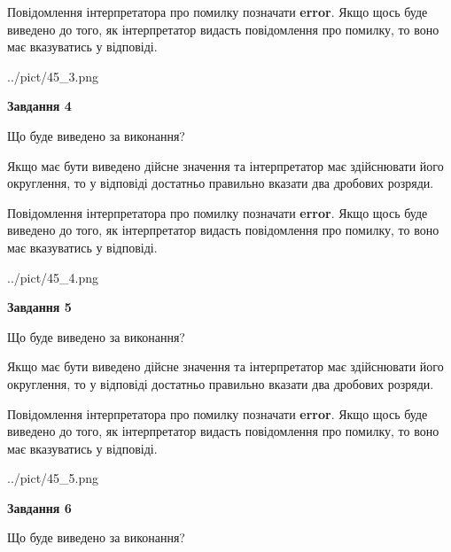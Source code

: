 \documentclass[12pt, ukrainian]{article}
\begin{document}
{\begin {Large}
Повідомлення інтерпретатора про помилку позначати \textbf{error}.
Якщо щось буде виведено до того, як інтерпретатор видасть повідомлення про помилку, 
то воно має вказуватись у відповіді. \par

\begin{center}
	{../pict/45_3.png}
\end{center}
\newpage

{\begin {center}\textbf{Завдання 4}\end {center}}\par
Що буде виведено за виконання? \par

Якщо має бути виведено дійсне значення та інтерпретатор має здійснювати його округлення, 
то у відповіді достатньо правильно вказати два дробових розряди.

Повідомлення інтерпретатора про помилку позначати \textbf{error}.
Якщо щось буде виведено до того, як інтерпретатор видасть повідомлення про помилку, 
то воно має вказуватись у відповіді. \par

\begin{center}
	{../pict/45_4.png}
\end{center}
\newpage

{\begin {center}\textbf{Завдання 5}\end {center}}\par
Що буде виведено за виконання? \par

Якщо має бути виведено дійсне значення та інтерпретатор має здійснювати його округлення, 
то у відповіді достатньо правильно вказати два дробових розряди.

Повідомлення інтерпретатора про помилку позначати \textbf{error}.
Якщо щось буде виведено до того, як інтерпретатор видасть повідомлення про помилку, 
то воно має вказуватись у відповіді. \par

\begin{center}
	{../pict/45_5.png}
\end{center}
\newpage

{\begin {center}\textbf{Завдання 6}\end {center}}\par
Що буде виведено за виконання? \par


\end{Large}}
\end{document}
